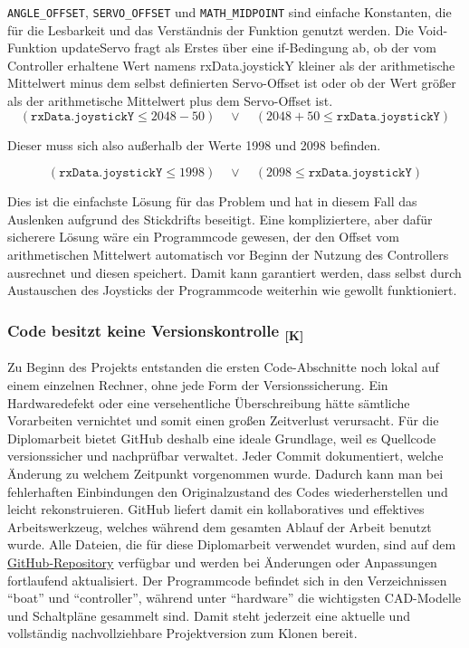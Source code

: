 \documentclass[a4paper,12pt]{article}
\begin{document}
\texttt{ANGLE\_OFFSET}, \texttt{SERVO\_OFFSET} und \texttt{MATH\_MIDPOINT} sind einfache Konstanten, die für die Lesbarkeit und das Verständnis der Funktion genutzt werden. Die Void-Funktion updateServo fragt als Erstes über eine if-Bedingung ab, ob der vom Controller erhaltene Wert namens rxData.joystickY kleiner als der arithmetische Mittelwert minus dem selbst definierten Servo-Offset ist oder ob der Wert größer als der arithmetische Mittelwert plus dem Servo-Offset ist. 
\begin{equation}
(\texttt{rxData.joystickY} \leq 2048 - 50) \quad \lor \quad (2048 + 50 \leq \texttt{rxData.joystickY})
\end{equation}

Dieser muss sich also außerhalb der Werte 1998 und 2098 befinden.

\begin{equation}
(\texttt{rxData.joystickY} \leq 1998) \quad \lor \quad (2098 \leq \texttt{rxData.joystickY})
\end{equation}

Dies ist die einfachste Lösung für das Problem und hat in diesem Fall das Auslenken aufgrund des Stickdrifts beseitigt. Eine kompliziertere, aber dafür sicherere Lösung wäre ein Programmcode gewesen, der den Offset vom arithmetischen Mittelwert automatisch vor Beginn der Nutzung des Controllers ausrechnet und diesen speichert. Damit kann garantiert werden, dass selbst durch Austauschen des Joysticks der Programmcode weiterhin wie gewollt funktioniert. 

\subsubsection{\texorpdfstring{Code besitzt keine Versionskontrolle \textsubscript{[K]}}{Code besitzt keine Versionskontrolle [K]}}
Zu Beginn des Projekts entstanden die ersten Code-Abschnitte noch lokal auf einem einzelnen Rechner, ohne jede Form der Versionssicherung. Ein Hardwaredefekt oder eine versehentliche Überschreibung hätte sämtliche Vorarbeiten vernichtet und somit einen großen Zeitverlust verursacht. Für die Diplomarbeit bietet GitHub\cite{github_about_git} deshalb eine ideale Grundlage, weil es Quellcode versionssicher und nachprüfbar verwaltet. Jeder Commit dokumentiert, welche Änderung zu welchem Zeitpunkt vorgenommen wurde. Dadurch kann man bei fehlerhaften Einbindungen den Originalzustand des Codes wiederherstellen und leicht rekonstruieren. GitHub liefert damit ein kollaboratives und effektives Arbeitswerkzeug, welches während dem gesamten Ablauf der Arbeit benutzt wurde. Alle Dateien, die für diese Diplomarbeit verwendet wurden, sind auf dem \href{https://github.com/skramperger/Flettner-Aero-Sail}{GitHub-Repository} verfügbar und werden bei Änderungen oder Anpassungen fortlaufend aktualisiert. Der Programmcode befindet sich in den Verzeichnissen \enquote{boat} und \enquote{controller}, während unter \enquote{hardware} die wichtigsten CAD-Modelle und Schaltpläne gesammelt sind. Damit steht jederzeit eine aktuelle und vollständig nachvollziehbare Projektversion zum Klonen bereit.
\end{document}
